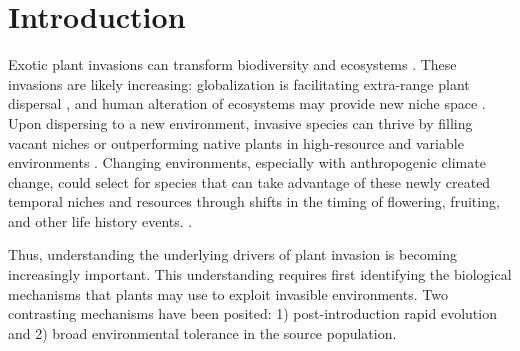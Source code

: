 \documentclass[12pt]{article}\usepackage[]{graphicx}\usepackage[]{color}
\begin{document}
	\section{Introduction} 
	Exotic plant invasions  can transform biodiversity and ecosystems \parencite{Bellard2016, Pejchar2009,Mack2000}. %
These invasions are likely increasing: globalization is facilitating extra-range plant dispersal \parencite{Helmus2014}, and human alteration of ecosystems may provide new niche space \parencite{Tilman2001, Blois2013,Inouye2008,Harte2015}. Upon dispersing to a new environment, invasive species can thrive by filling vacant niches \parencite{Elton1958} or outperforming native plants in high-resource and variable environments \parencite{Davis2001,Daehler2003}. Changing environments, especially with anthropogenic climate change, could select for species that can take advantage of these newly created temporal niches and resources through shifts in the timing of flowering, fruiting, and other life history events. \parencite{Franks2007}. 
	
	Thus, understanding the underlying drivers of plant invasion is becoming increasingly important. This understanding requires first identifying the biological mechanisms that plants may use to exploit invasible environments. Two contrasting mechanisms have been posited: 1) post-introduction rapid evolution and 2) broad environmental tolerance in the source population. 
\end{document}
